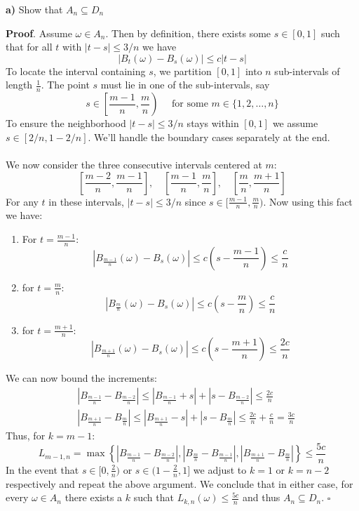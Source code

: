 \documentclass{article}
\begin{document}
\begin{tcolorbox}
[colframe=black,colback=gray!5,boxrule=0.5pt]
\textbf{a)} Show that $A_n\subseteq D_n$
\end{tcolorbox}
\textbf{Proof}. Assume $\omega\in A_n$. Then by definition, there exists some $s\in[0,1]$ such that for all $t$ with $|t-s|\leq 3/n$ we have 
$$|B_{t}(\omega) - B_s(\omega)|\leq c|t-s|$$
To locate the interval containing $s$, we partition $[0,1]$ into $n$ sub-intervals of length $\frac{1}{n}$. The point $s$ must lie in one of the sub-intervals, say 
$$s\in\left[\frac{m-1}{n}, \frac{m}{n}\right)\quad \text{ for some } m\in\{1,2,\dots,n\}$$ 
To ensure the neighborhood $|t-s|\leq 3/n$ stays within $[0,1]$ we assume $s\in[2/n, 1 -2/n]$. We'll handle the boundary cases separately at the end. \\
\\
We now consider the three consecutive intervals centered at $m$: 
$$\left[\frac{m-2}{n}, \frac{m-1}{n}\right], \quad \left[\frac{m-1}{n}, \frac{m}{n}\right], \quad \left[\frac{m}{n}, \frac{m+1}{n}\right]$$
For any $t$ in these intervals, $|t-s|\leq 3/n$ since $s\in[\frac{m-1}{n}, \frac{m}{n})$. Now using this fact we have: 
\begin{enumerate}
    \item For $t=\frac{m-1}{n}$: $$|B_{\frac{m-1}{n}}(\omega) - B_s(\omega)|\leq c\left(s - \frac{m-1}{n}\right) \leq \frac{c}{n}$$

    \item for $t = \frac{m}{n}$: 
    $$|B_{\frac{m}{n}}(\omega) - B_s(\omega)|\leq c\left(s - \frac{m}{n}\right) \leq \frac{c}{n}$$

    \item for $t = \frac{m+1}{n}$:
    $$|B_{\frac{m+1}{n}}(\omega) - B_s(\omega)|\leq c\left(s - \frac{m+1}{n}\right) \leq \frac{2c}{n}$$
\end{enumerate}
We can now bound the increments: 
\begin{align*}
     & |B_{\frac{m-1}{n}} - B_{\frac{m-2}{n}}| \leq |B_{\frac{m-1}{n}} 
 + s| + | s - B_{\frac{m-2}{n}}| \leq \frac{2c}{n} \\
  & |B_{\frac{m+1}{n}} - B_{\frac{m}{n}}| \leq |B_{\frac{m+1}{n}} - s | + |s - B_{\frac{m}{n}}| \leq \frac{2c}{n} + \frac{c}{n} = \frac{3c}{n}
\end{align*}
Thus, for $k=m-1$: 
$$L_{m-1, n} = \max \left\{ |B_{\frac{m-1}{n}} - B_{\frac{m-2}{n}}|, |B_{\frac{m}{n}} - B_{\frac{m-1}{n}}|, |B_{\frac{m+1}{n}} - B_{\frac{m}{n}}|\right\}\leq \frac{5c}{n}$$
In the event that $s\in[0, \frac{2}{n})$ or $s\in(1 - \frac{2}{n}, 1]$ we adjust to $k=1$ or $k=n-2$ respectively and repeat the above argument. We conclude that in either case, for every $\omega\in A_n$ there exists a $k$ such that $L_{k,n}(\omega)\leq \frac{5c}{n}$ and thus $A_n\subseteq D_n$. $\square$
\end{document}
